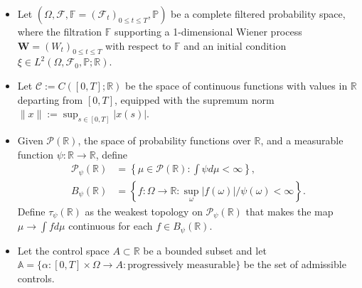 \documentclass[11pt]{article}
\theoremstyle{definition}
\begin{document}
\begin{itemize}
    \item Let $(\Omega,\mathcal{F},\mathbb{F}=(\mathcal{F}_t)_{0\leq t\leq T},\mathbb{P})$ be a complete filtered probability space, where the filtration $\mathbb{F}$ supporting a 1-dimensional Wiener process $\bm{W}=(W_t)_{0\leq t\leq T}$ with respect to $\mathbb{F}$ and an initial condition $\xi\in L^2(\Omega,\mathcal{F}_0,\mathbb{P};\mathbb{R})$.
    \item Let $\mathcal{C} := C([0,T]; \mathbb{R})$ be the space of continuous functions with values in $\mathbb{R}$ departing from $[0,T]$, equipped with the supremum norm $\|x\| := \sup_{s \in [0,T]} |x(s)|$.
    \item Given $\mathcal{P}(\mathbb{R})$, the space of probability functions over $\mathbb{R}$, and a measurable function $\psi : \mathbb{R} \to \mathbb{R}$, define
    \begin{align*}
        \mathcal{P}_{\psi}(\mathbb{R}) &= \left\{ \mu \in \mathcal{P}(\mathbb{R}) : \int \psi d\mu < \infty \right\}, \\
        B_{\psi}(\mathbb{R}) &= \left\{ f:\Omega\to\mathbb{R} : \sup_\omega |f(\omega)|/\psi(\omega)<\infty \right\}.
    \end{align*}
    Define $\tau_{\psi}(\mathbb{R})$ as the weakest topology on $\mathcal{P}_{\psi}(\mathbb{R})$ that makes the map $\mu \to \int f d\mu$ continuous for each $f \in B_{\psi}(\mathbb{R})$.
    \item Let the control space $A \subset \mathbb{R}$ be a bounded subset and let $\mathbb{A} = \{\alpha : [0,T] \times \Omega \to A : \text{progressively measurable}\}$ be the set of admissible controls. 

\end{itemize}
\end{document}
